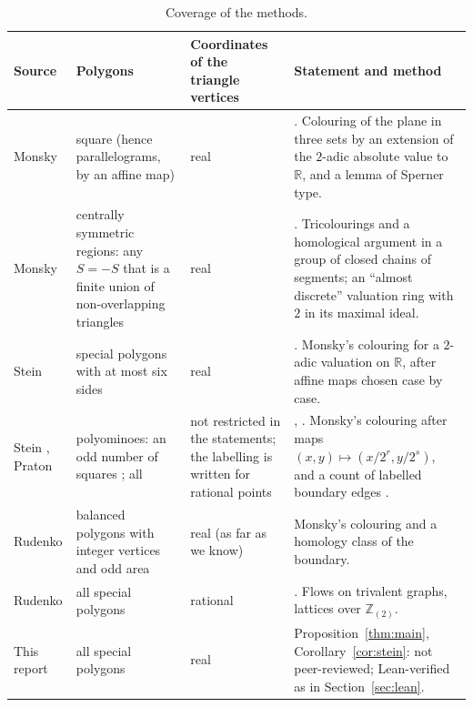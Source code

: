 \documentclass[11pt]{article}
\theoremstyle{definition}
\newcommand{\Z}{\mathbb{Z}}
\newcommand{\R}{\mathbb{R}}
\begin{document}
\begin{table}[!htbp]
\centering\small
\begin{tabular}{@{}>{\raggedright\arraybackslash}p{3.3cm}>{\raggedright\arraybackslash}p{3.7cm}>{\raggedright\arraybackslash}p{2.6cm}>{\raggedright\arraybackslash}p{5.2cm}@{}}
\toprule
Source & Polygons & Coordinates of the triangle vertices & Statement and method\\
\midrule
Monsky \cite{Mon70} & square (hence parallelograms, by an affine map) & real & \cite[pp.~161--164]{Mon70}. Colouring of the plane in three sets by an extension of the $2$-adic absolute value to $\R$, and a lemma of Sperner type.\\
Monsky \cite{Mon90} & centrally symmetric regions: any $S=-S$ that is a finite union of non-overlapping triangles & real & \cite[Theorems 3.8, 3.10]{Mon90}. Tricolourings and a homological argument in a group of closed chains of segments; an ``almost discrete'' valuation ring with $2$ in its maximal ideal.\\
Stein \cite{Ste00} & special polygons with at most six sides & real & \cite[Theorems 1, 2]{Ste00}. Monsky's colouring for a $2$-adic valuation on $\R$, after affine maps chosen case by case.\\
Stein \cite{Ste99}, Praton \cite{Pra} & polyominoes: an odd number of squares \cite{Ste99}; all \cite{Pra} & not restricted in the statements; the labelling is written for rational points & \cite[p.~256]{Ste99}, \cite[Theorem 6]{Pra}. Monsky's colouring after maps $(x,y)\mapsto(x/2^r,y/2^s)$, and a count of labelled boundary edges \cite[Chapter 5]{SS}.\\
Rudenko \cite{Rud12} & balanced polygons with integer vertices and odd area & real (as far as we know) & Monsky's colouring and a homology class of the boundary.\\
Rudenko \cite{Rud} & all special polygons & rational & \cite[Theorems 1, 2]{Rud}. Flows on trivalent graphs, lattices over $\Z_{(2)}$.\\
This report & all special polygons & real & Proposition~\ref{thm:main}, Corollary~\ref{cor:stein}: not peer-reviewed; Lean-verified as in Section~\ref{sec:lean}.\\
\bottomrule
\end{tabular}
\caption{Coverage of the methods.}\label{tab:coverage}
\end{table}
\end{document}
